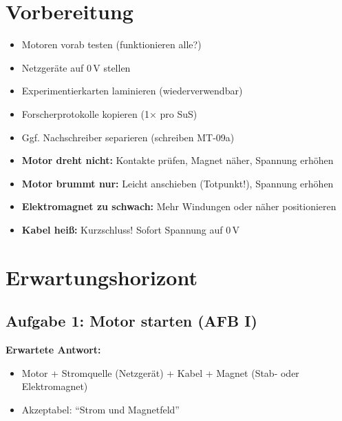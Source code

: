 \documentclass[11pt, a4paper]{article}
\begin{document}

\section*{Vorbereitung}

\begin{itemize}[noitemsep]
    \item Motoren vorab testen (funktionieren alle?)
    \item Netzgeräte auf 0\,V stellen
    \item Experimentierkarten laminieren (wiederverwendbar)
    \item Forscherprotokolle kopieren (1× pro SuS)
    \item Ggf. Nachschreiber separieren (schreiben MT-09a)
\end{itemize}

\begin{warnbox}
\begin{itemize}[noitemsep]
    \item \textbf{Motor dreht nicht:} Kontakte prüfen, Magnet näher, Spannung erhöhen
    \item \textbf{Motor brummt nur:} Leicht anschieben (Totpunkt!), Spannung erhöhen
    \item \textbf{Elektromagnet zu schwach:} Mehr Windungen oder näher positionieren
    \item \textbf{Kabel heiß:} Kurzschluss! Sofort Spannung auf 0\,V
\end{itemize}
\end{warnbox}


\section*{Erwartungshorizont}

\subsection*{Aufgabe 1: Motor starten (AFB I)}

\textbf{Erwartete Antwort:}
\begin{itemize}[noitemsep]
    \item Motor + Stromquelle (Netzgerät) + Kabel + Magnet (Stab- oder Elektromagnet)
    \item Akzeptabel: ``Strom und Magnetfeld''
\end{itemize}
\end{document}
